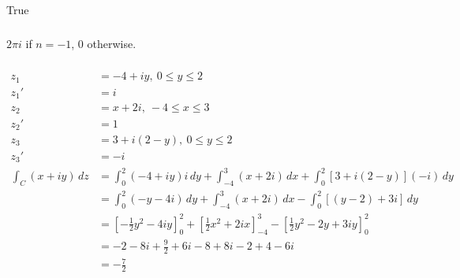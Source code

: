 \documentclass{article}
\begin{document}
True

\setcounter{subsubsection}{10}
\subsubsection{}

$2 \pi i$ if $n = -1$, $0$ otherwise.

\setcounter{subsubsection}{12}
\subsubsection{}

\begin{align*}
  z_1                    & = -4 + i y, \ 0 \le y \le 2                                                                                                                      \\
  z_1'                   & = i                                                                                                                                              \\
  z_2                    & = x + 2 i, \ -4 \le x \le 3                                                                                                                      \\
  z_2'                   & = 1                                                                                                                                              \\
  z_3                    & = 3 + i (2 - y), \ 0 \le y \le 2                                                                                                                 \\
  z_3'                   & = -i                                                                                                                                             \\
  \int_C (x + i y) \,d z & = \int_0^2 (-4 + i y) i \,d y + \int_{-4}^3 (x + 2 i) \,d x + \int_0^2 [3 + i (2 - y)] (-i) \,d y                                                \\
                         & = \int_0^2 (-y - 4 i) \,d y + \int_{-4}^3 (x + 2 i) \,d x - \int_0^2 [(y - 2) + 3 i] \,d y                                                       \\
                         & = \left[ -\frac{1}{2} y^2 - 4 i y \right]_0^2 + \left[ \frac{1}{2} x^2 + 2 i x \right]_{-4}^3 - \left[ \frac{1}{2} y^2 - 2 y + 3 i y \right]_0^2 \\
                         & = -2 - 8 i + \frac{9}{2} + 6 i - 8 + 8 i - 2 + 4 - 6 i                                                                                           \\
                         & = -\frac{7}{2}
\end{align*}
\end{document}
